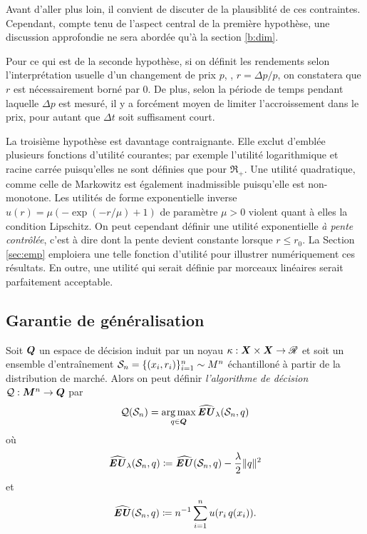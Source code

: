 Avant d'aller plus loin, il convient de discuter de la plausiblité de ces
contraintes. Cependant, compte tenu de l'aspect central de la première hypothèse, une
discussion approfondie ne sera abordée qu'à la section \ref{b:dim}.

Pour ce qui est de la seconde hypothèse, si on définit les rendements selon
l'interprétation usuelle d'un changement de prix $p$, \ie, $r = \Delta p/p$, on constatera que
$r$ est nécessairement borné par 0. De plus, selon la période de temps pendant laquelle
$\Delta p$ est mesuré, il y a forcément moyen de limiter l'accroissement dans le prix, pour
autant que $\Delta t$ soit suffisament court.

La troisième hypothèse est davantage contraignante. Elle exclut d'emblée plusieurs
fonctions d'utilité courantes; par exemple l'utilité logarithmique et racine carrée
puisqu'elles ne sont définies que pour $\Re_{+}$. Une utilité quadratique, comme celle de
Markowitz est également inadmissible puisqu'elle est non-monotone. Les utilités de forme
exponentielle inverse $u(r) = \mu(-\exp(-r/\mu)+1)$ de paramètre $\mu > 0$ violent quant à elles
la condition Lipschitz. On peut cependant définir une utilité exponentielle \textit{à
  pente contrôlée}, c'est à dire dont la pente devient constante lorsque $r \leq r_0$. La
Section \ref{sec:emp} emploiera une telle fonction d'utilité pour illustrer numériquement
ces résultats. En outre, une utilité qui serait définie par morceaux linéaires serait
parfaitement acceptable. 


\subsection{Garantie de généralisation}
\label{b:gen}


Soit $\Q$ un espace de décision induit par un noyau $\kappa : \X \times \X \to \Re$ et soit un ensemble
d'entraînement $\S_n = \{(x_i,r_i)\}_{i=1}^n \sim M^n$ échantilloné à partir de la
distribution de marché. Alors on peut définir \textit{l'algorithme de décision}
$\alg:\M^n \to \Q$ par
\begin{equation}
  \label{b:basic}
  \alg(\S_n) = \argmax_{q \in \Q} \hEU_\lambda(\S_n,q)
\end{equation}
où
\begin{equation}
  \hEU_\lambda(\S_n,q) \coloneq \hEU(\S_n,q) - \frac{\lambda}{2}\|q\|^2
\end{equation}
et
\begin{equation}
  \hEU(\S_n,q) \coloneq n^{-1}\sumi u(r_i\,q(x_i)).
\end{equation}

